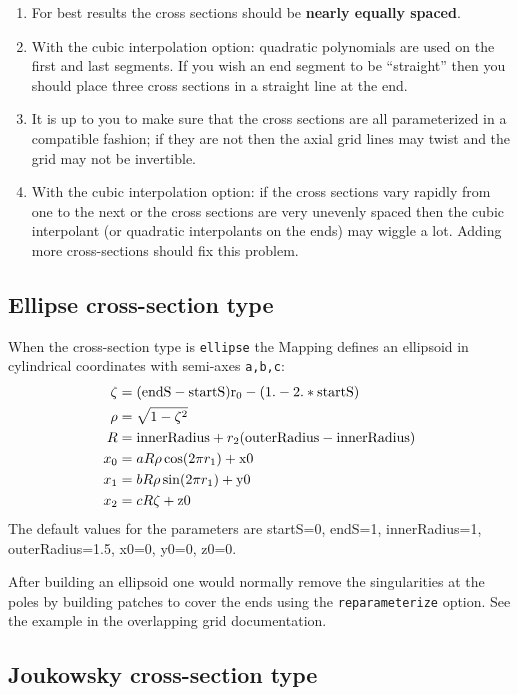 \begin{enumerate}
  \item For best results the cross sections should be {\bf nearly equally spaced}.
  \item With the cubic interpolation option: quadratic polynomials are used on the first
    and last segments. If you wish an end segment to be ``straight'' then you should
    place three cross sections in a straight line at the end.
  \item It is up to you to make sure that the cross sections are all parameterized in a 
     compatible fashion; if they are not then the axial grid lines may twist and the grid may not be
     invertible.
  \item With the cubic interpolation option: if the cross sections vary rapidly from one
    to the next or the cross sections are very unevenly spaced then the cubic interpolant 
    (or quadratic interpolants on the ends) may wiggle a lot. Adding more cross-sections
    should fix this problem.
\end{enumerate}

\subsection{Ellipse cross-section type}

  When the cross-section type is {\tt ellipse} the Mapping defines an ellipsoid
in cylindrical coordinates with semi-axes {\tt a,b,c}:
\begin{align*}
  \zeta &= (\rm{endS}-\rm{startS}) r_0 -(1.-2.*{\rm startS}) \\
  \rho &= \sqrt{ 1-\zeta^2 } \\
  R &= {\rm innerRadius} + r_2 (\rm{outerRadius}-{\rm innerRadius}) \\
  x_0 &= a R \rho \cos( 2\pi r_1)+\rm{x0} \\
  x_1 &= b R \rho \sin( 2\pi r_1)+\rm{y0} \\
  x_2 &= c R \zeta + \rm{z0}
\end{align*}
The default values for the parameters are startS=0, endS=1, innerRadius=1, outerRadius=1.5,
x0=0, y0=0, z0=0.

After building an ellipsoid one would normally remove the singularities at the
poles by building patches to cover the 
ends using the {\tt reparameterize} option. See the example in the overlapping
grid documentation.

\subsection{Joukowsky cross-section type}

